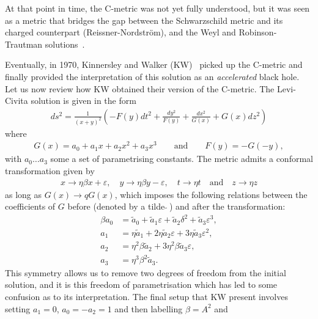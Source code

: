 \documentclass[
twoside,
openright,
frontopenright
]{dmathesis}
\newcommand{\ta}{\tilde{a}}
\begin{document}
At that point in time, the C-metric was not yet fully understood, but it was
seen as a metric that bridges the gap between the Schwarzschild metric and its
charged counterpart (Reissner-Nordstr\"om), and the Weyl and Robinson-Trautman
solutions~\cite{Kinnersley:1970zw}.

Eventually, in 1970, Kinnersley and Walker (KW)~\cite{Kinnersley:1970zw} picked
up the C-metric and finally provided the interpretation of this solution as an
\emph{accelerated} black hole. Let us now review how KW obtained their version
of the C-metric. The Levi-Civita solution is given in the form
\begin{align}
  \label{eq:levi-civita-metric}
  ds^2 = \frac{1}{(x+y)^2} \left(-F(y)dt^2 + \frac{dy^2}{F(y)} + \frac{dx^2}{G(x)}
  + G(x) dz^2\right)
\end{align}
where
\begin{align}
  G(x) = a_0 + a_1 x + a_2 x^2 + a_3 x^3 \qquad \mbox{and} \qquad F(y) = -G(-y),
\end{align}
with $a_0\ldots a_3$ some a set of parametrising constants. The metric admits
a conformal transformation given by
\begin{gather}
  \label{eq:cmet-transf}
  x\to \eta\beta x + \varepsilon, \quad y \to \eta\beta y - \varepsilon, \quad t \to \eta t \quad \mbox{and} \quad
  z\to \eta z
\end{gather}
as long as $G(x) \to q G(x)$, which imposes the following relations between the
coefficients of $G$ before (denoted by a tilde $\tilde{}~$) and after the
transformation:
\begin{subequations}
  \label{eq:cmet-coef}
  \begin{align}
    \beta a_0 &= \ta_0 + \ta_1 \varepsilon+ \ta_ 2 \delta^2 + \ta_3 \varepsilon^3, \label{eq:cmet-coef1}\\
    a_1 &= \eta \ta_1 + 2\eta\ta_2 \varepsilon + 3 \eta\ta_3 \varepsilon^2, \label{eq:cmet-coef2}\\
    a_2 &= \eta^2\beta\ta_2 + 3 \eta^2\beta\ta_3\varepsilon, \label{eq:cmet-coef3}\\
    a_3 &= \eta^3\beta^2\ta_3.\label{eq:cmet-coef4}
  \end{align}
\end{subequations}
This symmetry allows us to remove two degrees of freedom from the initial
solution, and it is this freedom of parametrisation which has led to some
confusion as to its interpretation. The final setup that KW present involves
setting $a_1 = 0$, $a_0 = -a_2 = 1$ and then labelling $\beta = A^2$ and
\end{document}
